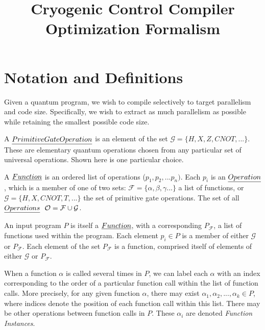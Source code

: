 \documentclass[12pt,twoside]{article}
\begin{document}
\title{Cryogenic Control Compiler Optimization Formalism}


\maketitle

\section{Notation and Definitions}
Given a quantum program, we wish to compile selectively to target parallelism and code size. Specifically, we wish to extract as much parallelism as possible while retaining the smallest possible code size.  

\begin{definition} A $\emph{Primitive Gate Operation}$ is an element of the set $\mathcal{G} = \{H, X, Z, CNOT, ...\}$. These are elementary quantum operations chosen from any particular set of universal operations. Shown here is one particular choice.
\end{definition}

\begin{definition} A $\emph{Function}$ is an ordered list of operations ($p_1, p_2, ... p_n)$. Each $p_i$ is an $\emph{Operation}$, which is a member of one of two sets: $\mathcal{F} = \{\alpha, \beta, \gamma ... \}$ a list of functions, or $\mathcal{G} = \{H, X, CNOT, T, ... \}$ the set of primitive gate operations. The set of all $\emph{Operations}\ \  \mathcal{O} = \mathcal{F} \cup \mathcal{G}$.
\end{definition}

\begin{definition} An input program $P$ is itself a $\emph{Function}$, with a corresponding $P_{\mathcal{F}}$, a list of functions used within the program. Each element $p_i \in P$ is a member of either $\mathcal{G}$ or $P_{\mathcal{F}}$. Each element of the set $P_{\mathcal{F}}$ is a function, comprised itself of elements of either $\mathcal{G}$ or $P_{\mathcal{F}}$. 
\end{definition}

\begin{definition} When a function $\alpha$ is called several times in $P$, we can label each $\alpha$ with an index corresponding to the order of a particular function call within the list of function calls. More precisely, for any given function $\alpha$, there may exist $\alpha_1, \alpha_2, ... , \alpha_k \in P$, where indices denote the position of each function call within this list. There may be other operations between function calls in $P$. These $\alpha_i$ are denoted \emph{Function Instances}. 
\end{definition}
\end{document}
